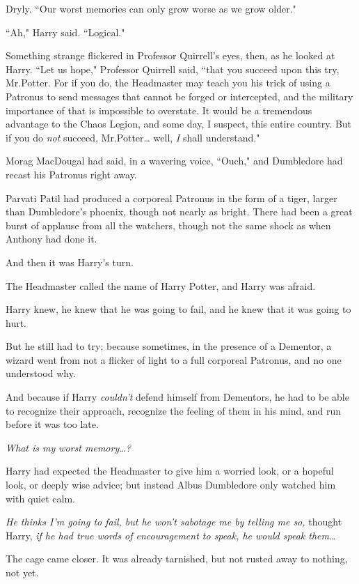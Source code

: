 Dryly. ``Our worst memories can only grow worse as we grow older."

``Ah," Harry said. ``Logical."

Something strange flickered in Professor Quirrell's eyes, then, as he looked at Harry. ``Let us hope," Professor Quirrell said, ``that you succeed upon this try, Mr.\?Potter. For if you do, the Headmaster may teach you his trick of using a Patronus to send messages that cannot be forged or intercepted, and the military importance of that is impossible to overstate. It would be a tremendous advantage to the Chaos Legion, and some day, I suspect, this entire country. But if you do \emph{not} succeed, Mr.\?Potter{\ldots} well, \emph{I} shall understand."

\later

Morag MacDougal had said, in a wavering voice, ``Ouch," and Dumbledore had recast his Patronus right away.

Parvati Patil had produced a corporeal Patronus in the form of a tiger, larger than Dumbledore's phoenix, though not nearly as bright. There had been a great burst of applause from all the watchers, though not the same shock as when Anthony had done it.

And then it was Harry's turn.

The Headmaster called the name of Harry Potter, and Harry was afraid.

Harry knew, he knew that he was going to fail, and he knew that it was going to hurt.

But he still had to try; because sometimes, in the presence of a Dementor, a wizard went from not a flicker of light to a full corporeal Patronus, and no one understood why.

And because if Harry \emph{couldn't} defend himself from Dementors, he had to be able to recognize their approach, recognize the feeling of them in his mind, and run before it was too late.

\emph{What is my worst memory{\ldots}?}

Harry had expected the Headmaster to give him a worried look, or a hopeful look, or deeply wise advice; but instead Albus Dumbledore only watched him with quiet calm.

\emph{He thinks I'm going to fail, but he won't sabotage me by telling me so,} thought Harry, \emph{if he had true words of encouragement to speak, he would speak them{\ldots}}

The cage came closer. It was already tarnished, but not rusted away to nothing, not yet.

